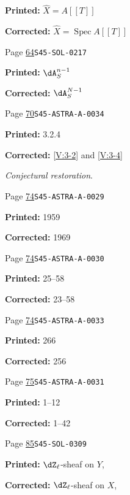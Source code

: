\documentclass[oneside]{book}
\providecommand\llbracket{[\! [}%
\providecommand\rrbracket{]\! ]}}
\DeclareMathOperator{\spec}{Spec}
\theoremstyle{sga-source}
\theoremstyle{sga-source-dash}
\theoremstyle{sga-source-dotdash}
\theoremstyle{sga-source-number-note-dash}
\theoremstyle{sga-source-note-number-dotdash}
\theoremstyle{sga-source-example-dotdash}
\theoremstyle{sga-source-inline-number}
\theoremstyle{sga-source-bare-number}
\theoremstyle{sga-source}
\begin{document}
\begin{description}
\par\noindent\textbf{Printed:} \(\widehat X=A\llbracket T\rrbracket\)
\par\noindent\textbf{Corrected:} \(\widehat X=\spec A\llbracket T\rrbracket\)
\smallskip
\item[\hypertarget{apparatus:EN-0022}{22}] Page \hyperlink{printpage:en:64}{64}\quad\texttt{S45-SOL-0217}
\par\noindent\textbf{Printed:} \(\dA_S^{n-1}\)
\par\noindent\textbf{Corrected:} \(\dA_S^{N-1}\)
\smallskip
\item[\hypertarget{apparatus:EN-0023}{23}] Page \hyperlink{printpage:en:70}{70}\quad\texttt{S45-ASTRA-A-0034}
\par\noindent\textbf{Printed:} 3.2.4
\par\noindent\textbf{Corrected:} \ref{V:3-2} and \ref{V:3-4}
\par\noindent\emph{Conjectural restoration}.
\smallskip
\item[\hypertarget{apparatus:EN-0024}{24}] Page \hyperlink{printpage:en:74}{74}\quad\texttt{S45-ASTRA-A-0029}
\par\noindent\textbf{Printed:} 1959
\par\noindent\textbf{Corrected:} 1969
\smallskip
\item[\hypertarget{apparatus:EN-0025}{25}] Page \hyperlink{printpage:en:74}{74}\quad\texttt{S45-ASTRA-A-0030}
\par\noindent\textbf{Printed:} 25--58
\par\noindent\textbf{Corrected:} 23--58
\smallskip
\item[\hypertarget{apparatus:EN-0026}{26}] Page \hyperlink{printpage:en:74}{74}\quad\texttt{S45-ASTRA-A-0033}
\par\noindent\textbf{Printed:} 266
\par\noindent\textbf{Corrected:} 256
\smallskip
\item[\hypertarget{apparatus:EN-0027}{27}] Page \hyperlink{printpage:en:75}{75}\quad\texttt{S45-ASTRA-A-0031}
\par\noindent\textbf{Printed:} 1--12
\par\noindent\textbf{Corrected:} 1--42
\smallskip
\item[\hypertarget{apparatus:EN-0028}{28}] Page \hyperlink{printpage:en:85}{85}\quad\texttt{S45-SOL-0309}
\par\noindent\textbf{Printed:} $\dZ_\ell$-sheaf on $Y$,
\par\noindent\textbf{Corrected:} $\dZ_\ell$-sheaf on $X$,

\end{description}
\end{document}
